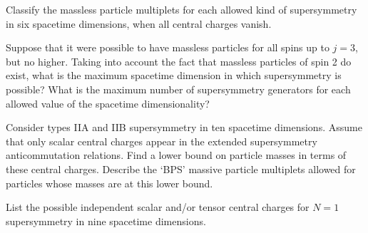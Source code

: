 
\begin{enumerate}
   Classify the massless particle multiplets for each allowed kind
  of supersymmetry in six spacetime dimensions, when all central charges
  vanish.

   Suppose that it were possible to have massless particles for
  all spins up to $j=3$, but no higher. Taking into account the fact
  that massless particles of spin 2 do exist, what is the maximum
  spacetime dimension in which supersymmetry is possible? What is the
  maximum number of supersymmetry generators for each allowed value of
  the spacetime dimensionality?

   Consider types IIA and IIB supersymmetry in ten spacetime
  dimensions. Assume that only scalar central charges appear in the
  extended supersymmetry anticommutation relations. Find a lower bound
  on particle masses in terms of these central charges. Describe the
  `BPS' massive particle multiplets allowed for particles whose masses
  are at this lower bound.

   List the possible independent scalar and/or tensor central
  charges for $N=1$ supersymmetry in nine spacetime dimensions.
\end{enumerate}
